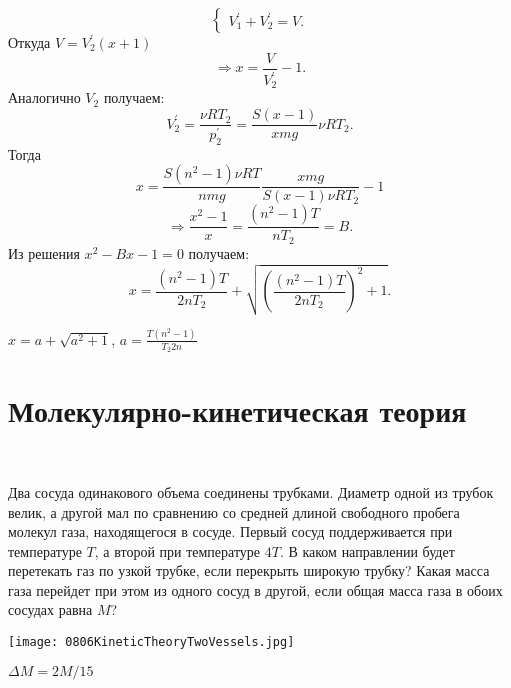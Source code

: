 \begin{ex}
\begin{sol}
\begin{minipage}{.5\textwidth}
\begin{equation}
\begin{cases}
V_{1}^{'}+V_{2}^{'}=V.
\end{cases}
\end{equation}
Откуда $V=V_{2}^{'}(x+1)$ $$\Rightarrow x=\dfrac{V}{V_{2}^{'}}-1.$$
Аналогично $V_{2}$ получаем: $$V_{2}^{'}=\dfrac{\nu RT_{2}}{p_{2}^{'}}=\dfrac{S(x-1)}{xmg}\nu RT_{2}.$$
Тогда $$x=\dfrac{S(n^2-1)\nu RT}{nmg}\dfrac{xmg}{S(x-1)\nu RT_{2}}-1$$ $$\Rightarrow \dfrac{x^2-1}{x}=\dfrac{(n^2-1)T}{nT_{2}}=B.$$
Из решения $x^2-Bx-1=0$ получаем: $$x=\dfrac{(n^2-1)T}{2nT_{2}}+\sqrt{\left(\dfrac{(n^2-1)T}{2nT_{2}}\right)^2+1}.$$
\end{minipage}
\end{sol}
\begin{ans}
$x = a + \sqrt{a^2+1}$, $a = \frac{T (n^2 - 1)}{T_2 2n}$
\end{ans}
\end{ex}

\section{Молекулярно-кинетическая теория}

\begin{ex}
\hspace{0pt} \\
\begin{minipage}{.65\textwidth}
Два сосуда одинакового объема соединены трубками. Диаметр одной из трубок велик, 
а другой мал по сравнению со средней длиной свободного пробега молекул газа, находящегося в сосуде. 
Первый сосуд поддерживается при температуре $T$, а второй при температуре $4T$. 
В каком направлении будет перетекать газ по узкой трубке, если перекрыть широкую трубку? 
Какая масса газа перейдет при этом из одного сосуд в другой, если общая масса газа в обоих сосудах равна $M$?
\end{minipage}
\begin{minipage}{.35\textwidth}
\centering
\texttt{[image: 0806KineticTheoryTwoVessels.jpg]}
\end{minipage}
\begin{ans}
$\Delta M = 2M/15$
\end{ans}
\end{ex}

